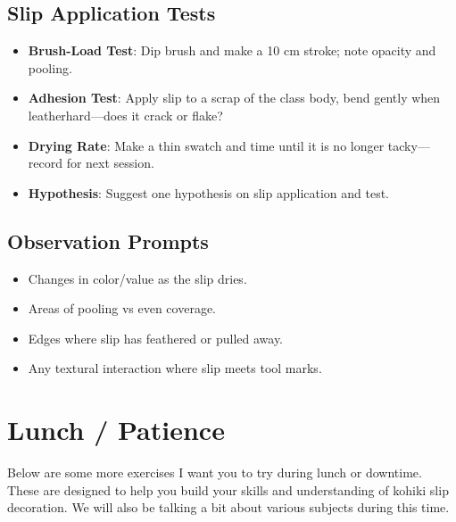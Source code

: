 \documentclass[12pt]{scrartcl}
\begin{document}
\subsection*{Slip Application Tests}
\begin{itemize}
  \item \textbf{Brush-Load Test}: Dip brush and make a 10 cm stroke; note opacity and pooling.
  \item \textbf{Adhesion Test}: Apply slip to a scrap of the class body, bend gently when leatherhard—does it crack or flake?
  \item \textbf{Drying Rate}: Make a thin swatch and time until it is no longer tacky—record for next session.
  \item \textbf{Hypothesis}: Suggest one hypothesis on slip application and test.
\end{itemize}

\subsection*{Observation Prompts}
\begin{itemize}
  \item Changes in color/value as the slip dries.
  \item Areas of pooling vs even coverage.
  \item Edges where slip has feathered or pulled away.
  \item Any textural interaction where slip meets tool marks.
\end{itemize}

\clearpage
\section*{Lunch / Patience}

Below are some more exercises I want you to try during lunch or downtime.  These are designed to help you build your skills and understanding of kohiki slip decoration.  We will also be talking a bit about various subjects during this time.
\end{document}
